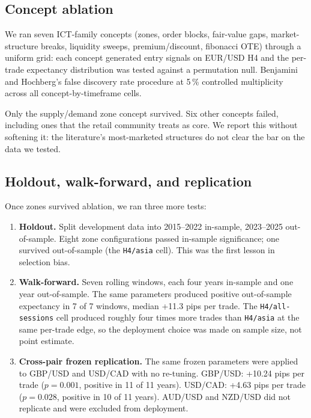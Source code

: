 \documentclass[11pt,a4paper]{article}
\begin{document}
\subsection{Concept ablation}\label{sec:ablation}

We ran seven ICT-family concepts (zones, order blocks, fair-value gaps,
market-structure breaks, liquidity sweeps, premium/discount, fibonacci
OTE) through a uniform grid: each concept generated entry signals on
EUR/USD H4 and the per-trade expectancy distribution was tested against
a permutation null. Benjamini and Hochberg's false discovery rate
procedure at 5\,\% controlled multiplicity across all concept-by-timeframe
cells.

Only the supply/demand zone concept survived. Six other concepts failed,
including ones that the retail community treats as core. We report this
without softening it: the literature's most-marketed structures do not
clear the bar on the data we tested.

\subsection{Holdout, walk-forward, and replication}\label{sec:validation}

Once zones survived ablation, we ran three more tests:

\begin{enumerate}
  \item \textbf{Holdout.} Split development data into 2015--2022
        in-sample, 2023--2025 out-of-sample. Eight zone configurations
        passed in-sample significance; one survived out-of-sample
        (the \texttt{H4/asia} cell). This was the first lesson in
        selection bias.
  \item \textbf{Walk-forward.} Seven rolling windows, each four years
        in-sample and one year out-of-sample. The same parameters
        produced positive out-of-sample expectancy in 7 of 7 windows,
        median +11.3 pips per trade. The \texttt{H4/all-sessions} cell
        produced roughly four times more trades than \texttt{H4/asia}
        at the same per-trade edge, so the deployment choice was made
        on sample size, not point estimate.
  \item \textbf{Cross-pair frozen replication.} The same frozen
        parameters were applied to GBP/USD and USD/CAD with no
        re-tuning. GBP/USD: +10.24 pips per trade ($p=0.001$, positive
        in 11 of 11 years). USD/CAD: +4.63 pips per trade ($p=0.028$,
        positive in 10 of 11 years). AUD/USD and NZD/USD did not
        replicate and were excluded from deployment.
\end{enumerate}
\end{document}
